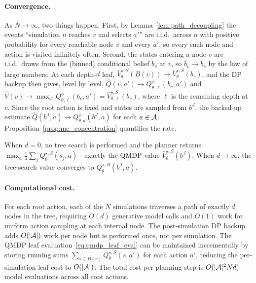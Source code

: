 \paragraph{Convergence.}
As $N\to\infty$, two things happen.
First, by Lemma~\ref{lem:path_decoupling} the events ``simulation $n$ reaches $v$ and selects $a'$'' are i.i.d.\ across $n$ with positive probability for every reachable node $v$ and every $a'$, so every such node and action is visited infinitely often.
Second, the states entering a node $v$ are i.i.d.\ draws from the (binned) conditional belief $b_v$ at $v$, so $\hat b_v\to b_v$ by the law of large numbers.
At each depth-$d$ leaf, $\bar V_\theta^{\star,S}(B(v))\to\bar V_\theta^{\star,S}(b_v)$, and the DP backup then gives, level by level, $\hat Q(v,a')\to Q_{\theta,\ell}^{\phi}(b_v,a')$ and $\hat V(v)\to \max_{a'}Q_{\theta,\ell}^{\phi}(b_v,a')=\bar V_{\theta,\ell}^{\star,S}(b_v)$, where $\ell$ is the remaining depth at $v$.
Since the root action is fixed and states are sampled from $b^J$, the backed-up estimate $\widehat Q(b^J,a)\to Q_{\theta,d}^{\phi}(b^J,a)$ for each $a\in{\mathcal{A}}$.
Proposition~\ref{prop:mc_concentration} quantifies the rate.

When $d=0$, no tree search is performed and the planner returns $\max_a\frac{1}{J}\sum_j Q_\theta^{\star,S}(s_j,a)$---exactly the QMDP value $\bar V_\theta^{\star,S}(b^J)$.
When $d\to\infty$, the tree-search value converges to $Q_\theta^{\star,B}(b^J,a)$.

\paragraph{Computational cost.}
For each root action, each of the $N$ simulations traverses a path of exactly $d$ nodes in the tree, requiring $O(d)$ generative model calls and $O(1)$ work for uniform action sampling at each internal node.
The post-simulation DP backup adds $O(|{\mathcal{A}}|)$ work per node but is performed once, not per simulation.
The QMDP leaf evaluation~\eqref{eq:qmdp_leaf_eval} can be maintained incrementally by storing running sums $\sum_{s\in B(v)}Q_\theta^{\star,S}(s,a')$ for each action $a'$, reducing the per-simulation leaf cost to $O(|{\mathcal{A}}|)$.
The total cost per planning step is $O(|{\mathcal{A}}|^2 Nd)$ model evaluations across all root actions.

